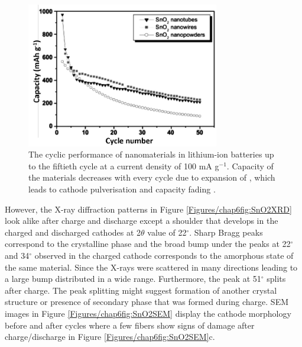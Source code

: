 \begin{figure}[th!]
\centering
\includegraphics[width=0.75\textwidth]{Figures/chap6fig/sno2pap.pdf}
\caption{The cyclic performance of  nanomaterials in lithium-ion batteries up to the fiftieth cycle at a current density of 100 mA g$^{-1}$. Capacity of the materials decreases with every cycle due to expansion of , which leads to cathode pulverisation and capacity fading \cite{park_effect_2008}.}
\label{Figures/chap6fig:sno2pap}
\end{figure}

However, the X-ray diffraction patterns in Figure \ref{Figures/chap6fig:SnO2XRD} look alike after charge and discharge except a shoulder that develops in the charged and discharged cathodes at 2$\theta$ value of 22$^{\circ}$. Sharp Bragg peaks correspond to the crystalline phase and the broad bump under the peaks at 22$^{\circ}$ and  34$^{\circ}$ observed in the charged cathode corresponds to the amorphous state of the same material. Since the X-rays were scattered in many directions leading to a large bump distributed in a wide range. Furthermore, the peak at  51$^{\circ}$ splits after charge. The peak splitting might suggest formation of another crystal structure or presence of secondary phase that was formed during charge. SEM images in Figure \ref{Figures/chap6fig:SnO2SEM} display the cathode morphology before and after cycles where a few fibers show signs of damage after charge/discharge in Figure \ref{Figures/chap6fig:SnO2SEM}c. 

